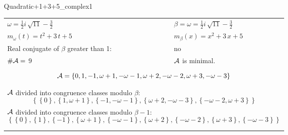 \begin{exmp}
\label{ex:compareAN}

Quadratic+1+3+5\_complex1

\rule{0cm}{0cm}

\begin{tabular}{ll}
$\omega=  \frac{1}{2} i \, \sqrt{11} - \frac{3}{2} $  & $\beta= \omega = \frac{1}{2} i \, \sqrt{11} - \frac{3}{2} $\\
$m_\omega(t)=  t^{2} + 3 \, t + 5 $  & $m_\beta(x)=  x^{2} + 3 \, x + 5 $\\
Real conjugate of $\beta$ greater than 1:   &  no \\
$\#\mathcal{A}= $ 9 $ $ & $\mathcal{A}$ is minimal. \\
\multicolumn{2}{l}{\begin{minipage}{\textwidth}\begin{dmath*}\A = \left\{0, 1, -1, \omega + 1, -\omega - 1, \omega + 2, -\omega - 2, \omega + 3, -\omega - 3\right\}  \end{dmath*}\end{minipage} }\\
\multicolumn{2}{l}{\begin{minipage}{\textwidth}$\mathcal{A}$ divided into congruence classes modulo $\beta$: \begin{dmath*} \left\{\left\{0\right\}, \left\{1, \omega + 1\right\}, \left\{-1, -\omega - 1\right\}, \left\{\omega + 2, -\omega - 3\right\}, \left\{-\omega - 2, \omega + 3\right\}\right\}  \end{dmath*}\end{minipage} }\\[10pt]
\multicolumn{2}{l}{\begin{minipage}{\textwidth}$\mathcal{A}$ divided into congruence classes modulo $\beta-1$: \begin{dmath*} \left\{\left\{0\right\}, \left\{1\right\}, \left\{-1\right\}, \left\{\omega + 1\right\}, \left\{-\omega - 1\right\}, \left\{\omega + 2\right\}, \left\{-\omega - 2\right\}, \left\{\omega + 3\right\}, \left\{-\omega - 3\right\}\right\}  \end{dmath*}\end{minipage} }\\
 & \\ \hline
 & \\
\end{tabular}


\end{exmp}
